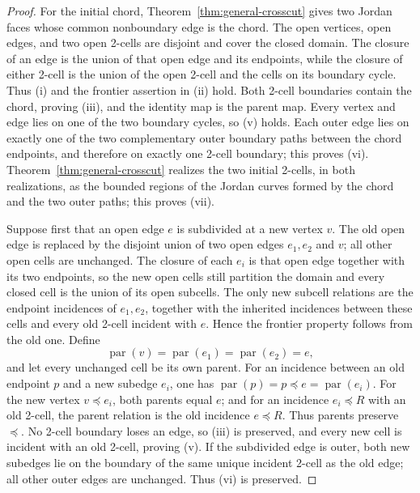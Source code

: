 \documentclass[11pt]{article}
\theoremstyle{mainplain}
\theoremstyle{mainroman}
\theoremstyle{definition}
\numberwithin{equation}{section}
\begin{document}
\begin{proof}
For the initial chord, Theorem~\ref{thm:general-crosscut} gives two Jordan faces whose common nonboundary edge is the chord. The open vertices, open edges, and two open 2-cells are disjoint and cover the closed domain. The closure of an edge is the union of that open edge and its endpoints, while the closure of either 2-cell is the union of the open 2-cell and the cells on its boundary cycle. Thus (i) and the frontier assertion in (ii) hold. Both 2-cell boundaries contain the chord, proving (iii), and the identity map is the parent map. Every vertex and edge lies on one of the two boundary cycles, so (v) holds. Each outer edge lies on exactly one of the two complementary outer boundary paths between the chord endpoints, and therefore on exactly one 2-cell boundary; this proves (vi). Theorem~\ref{thm:general-crosscut} realizes the two initial 2-cells, in both realizations, as the bounded regions of the Jordan curves formed by the chord and the two outer paths; this proves (vii).

Suppose first that an open edge \(e\) is subdivided at a new vertex \(v\). The old open edge is replaced by the disjoint union of two open edges \(e_1,e_2\) and \(v\); all other open cells are unchanged. The closure of each \(e_i\) is that open edge together with its two endpoints, so the new open cells still partition the domain and every closed cell is the union of its open subcells. The only new subcell relations are the endpoint incidences of \(e_1,e_2\), together with the inherited incidences between these cells and every old 2-cell incident with \(e\). Hence the frontier property follows from the old one. Define
\[
 \operatorname{par}(v)=\operatorname{par}(e_1)
 =\operatorname{par}(e_2)=e,
\]
and let every unchanged cell be its own parent. For an incidence between an old endpoint $p$ and a new subedge
$e_i$, one has
\(
 \operatorname{par}(p)=p\preceq e=\operatorname{par}(e_i).
\)
For the new vertex $v\preceq e_i$, both parents equal $e$; and for an
incidence $e_i\preceq R$ with an old 2-cell, the parent relation is the
old incidence $e\preceq R$. Thus parents preserve $\preceq$. No
2-cell boundary loses an edge, so (iii) is preserved, and every new
cell is incident with an old 2-cell, proving (v). If the subdivided
edge is outer, both new subedges lie on the boundary of the same unique
incident 2-cell as the old edge; all other outer edges are unchanged.
Thus (vi) is preserved.


\end{proof}
\end{document}
